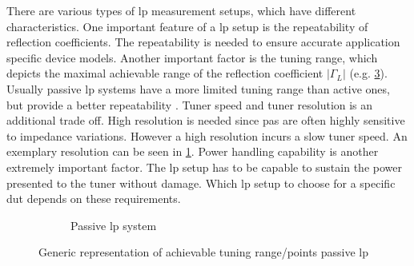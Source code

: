 \documentclass[12pt,a4paper,parskip=full,abstract=true,BCOR=10mm,twoside,open=right]{scrreprt}
\providecommand{\abs}[1]{\lvert#1\rvert}
\begin{document}
There are various types of \gls{lp} measurement setups, which have different
characteristics. One important feature of a \gls{lp} setup is the repeatability of reflection
coefficients. The repeatability is needed to ensure accurate application
specific device models. Another important factor is the tuning range, which
depicts the maximal achievable range of the reflection coefficient $\abs{\Gamma_L}$
(e.g. \cref{fig:range_passive}). Usually passive \gls{lp}
systems have a more limited tuning range than active ones, but provide a
better repeatability \cite{ghannouchi_load-pull_2013}. Tuner speed and tuner
resolution is an additional trade off. High resolution is needed since \glspl{pa} are often
highly sensitive to impedance variations. However a high resolution incurs
a slow tuner speed. An exemplary resolution can be seen in \cref{fig:generic_emt}.
Power handling capability is another extremely important factor. The \gls{lp}
setup has to be capable to sustain the power presented to the tuner without
damage. Which \gls{lp} setup to choose for a specific \gls{dut} depends on
these requirements.

\begin{figure}[htb]
    \begin{subfigure}[b]{.5\linewidth}
        \centering
        \caption{}
        \label{fig:generic_emt}
    \end{subfigure}%
    \begin{subfigure}[b]{.5\linewidth}
        \centering
        \caption{Passive \gls{lp} system}
        \label{fig:range_passive}
    \end{subfigure}
    \caption{Generic representation of achievable tuning range/points passive \gls{lp}}
\end{figure}
\end{document}
